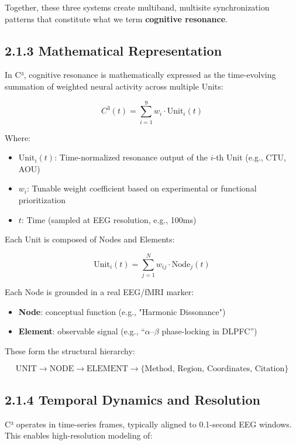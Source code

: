 Together, these three systems create multiband, multisite synchronization patterns that constitute what we term \textbf{cognitive resonance}.

\subsection*{2.1.3 Mathematical Representation}

In C³, cognitive resonance is mathematically expressed as the time-evolving summation of weighted neural activity across multiple Units:

\[
C^3(t) = \sum_{i=1}^{9} w_i \cdot \text{Unit}_i(t)
\]

Where:

\begin{itemize}
    \item $\text{Unit}_i(t)$: Time-normalized resonance output of the $i$-th Unit (e.g., CTU, AOU)
    \item $w_i$: Tunable weight coefficient based on experimental or functional prioritization
    \item $t$: Time (sampled at EEG resolution, e.g., 100ms)
\end{itemize}

Each Unit is composed of Nodes and Elements:

\[
\text{Unit}_i(t) = \sum_{j=1}^{N} w_{ij} \cdot \text{Node}_j(t)
\]

Each Node is grounded in a real EEG/fMRI marker:

\begin{itemize}
    \item \textbf{Node}: conceptual function (e.g., "Harmonic Dissonance")
    \item \textbf{Element}: observable signal (e.g., “$\alpha$–$\beta$ phase-locking in DLPFC”)
\end{itemize}

These form the structural hierarchy:

\[
\text{UNIT} \rightarrow \text{NODE} \rightarrow \text{ELEMENT} \rightarrow \{\text{Method, Region, Coordinates, Citation}\}
\]

\subsection*{2.1.4 Temporal Dynamics and Resolution}

C³ operates in time-series frames, typically aligned to 0.1-second EEG windows. This enables high-resolution modeling of:

